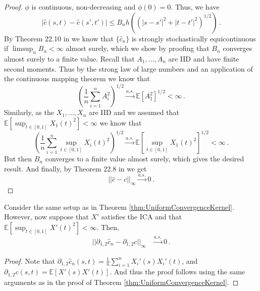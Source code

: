 \begin{proof}
    $\phi$ is continuous, non-decreasing and $\phi(0) = 0$. Thus, we have
    \[
        |\hat{c}(s, t) - \hat{c}(s', t')| \leq B_n h\left((|s - s'|^2 + |t - t'|^2)^{1/2}\right) \,.
    \]
    By Theorem 22.10 in
    \cite{davidson2021} we know that $\{\hat{c}_n \}$ is strongly stochastically equicontinuous if
    $\limsup_n B_n < \infty$ almost surely, which we show by proofing that $B_n$ converges almost
    surely to a finite value. Recall that $A_1, \dots, A_n$ are IID and have finite second moments.
    Thus by the strong law of large numbers and an application of the continuous mapping theorem we
    know that
    \[
        \left(\frac{1}{n} \sum_{i=1}^n A_i^2\right)^{1/2} \overset{a.s.}{\to}
        \mathbb{E}[A_1^2]^{1/2} < \infty \,.
    \]
    Similarly, as the $X_1, \dots, X_n$ are IID and we assumed that $\mathbb{E}[\sup_{t \in [0, 1]}
    X_1(t)^2] < \infty$ we know that
    \[
        \left(\frac{1}{n} \sum_{i=1}^n \sup_{t \in [0, 1]} X_i(t)^2\right)^{1/2} \overset{a.s.}{\to}
        \mathbb{E}[\sup_{t \in [0, 1]} X_1(t)^2]^{1/2} < \infty \,.
    \]
    But then $B_n$ converges to a finite value almost surely, which gives the desired result. And
    finally, by Theorem 22.8 in \cite{davidson2021} we get
    \[
        ||\hat{c} - c||_\infty \overset{a.s.}{\to} 0 \,.
    \]
\end{proof}

\begin{theorem}\label{thm:UniformConvergenceKernelDerivative}
    Consider the same setup as in Theorem \ref{thm:UniformConvergenceKernel}. However, now suppose
    that $X'$ satisfies the ICA and that $\mathbb{E}[\sup_{t \in [0, 1]} X'(t)^2] < \infty$. Then,
    \begin{align}
        || \partial_{1, 2}\hat{c}_n - \partial_{1, 2}c ||_\infty &\overset{a.s.}{\to} 0 \,.
    \end{align}
\end{theorem}
\begin{proof}
    Note that $\partial_{1, 2} \hat{c}_n(s, t) = \frac{1}{n} \sum_{i = 1}^n X_i'(s) X_i'(t)$, and
    $\partial_{1, 2} c(s, t) = \mathbb{E}[X'(s) X'(t)]$. And thus the proof follows using the same
    arguments as in the proof of Theorem \ref{thm:UniformConvergenceKernel}.
\end{proof}


